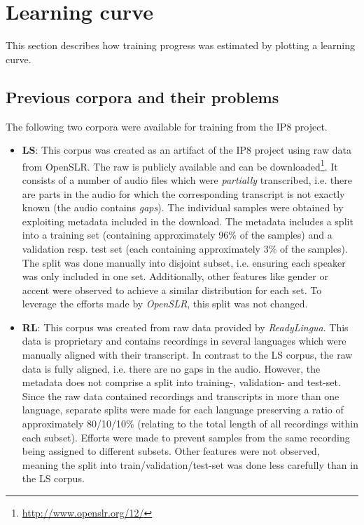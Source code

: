 \section{Learning curve}

This section describes how training progress was estimated by plotting a learning curve.

\subsection{Previous corpora and their problems}

The following two corpora were available for training from the IP8 project.

\begin{itemize}
	\item \textbf{\ac{LS}}: This corpus was created as an artifact of the IP8 project using raw data from OpenSLR. The raw is publicly available and can be downloaded\footnote{\url{http://www.openslr.org/12/}}. It consists of a number of audio files which were \textit{partially} transcribed, i.e. there are parts in the audio for which the corresponding transcript is not exactly known (the audio contains \textit{gaps}). The individual samples were obtained by exploiting metadata included in the download. The metadata includes a split into a training set (containing approximately 96\% of the samples) and a validation resp. test set (each containing approximately 3\% of the samples). The split was done manually into disjoint subset, i.e. ensuring each speaker was only included in one set. Additionally, other features like gender or accent were observed to achieve a similar distribution for each set. To leverage the efforts made by \textit{OpenSLR}, this split was not changed.
	\item \textbf{\ac{RL}}: This corpus was created from raw data provided by \textit{ReadyLingua}. This data is proprietary and contains recordings in several languages which were manually aligned with their transcript. In contrast to the \ac{LS} corpus, the raw data is fully aligned, i.e. there are no gaps in the audio. However, the metadata does not comprise a split into training-, validation- and test-set. Since the raw data contained recordings and transcripts in more than one language, separate splits were made for each language preserving a ratio of approximately 80/10/10\% (relating to the total length of all recordings within each subset). Efforts were made to prevent samples from the same recording being assigned to different subsets. Other features were not observed, meaning the split into train/validation/test-set was done less carefully than in the \ac{LS} corpus.
\end{itemize}

